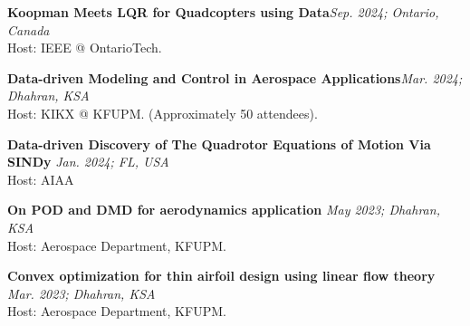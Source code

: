 \textbf{Koopman Meets LQR for Quadcopters using Data}\hfill {\textit{Sep. 2024; Ontario, Canada}}\\
Host: IEEE @ OntarioTech.
\vspace{0.1cm}

\textbf{Data-driven Modeling and Control in Aerospace Applications}\hfill {\textit{Mar. 2024; Dhahran, KSA}}\\
Host: KIKX @ KFUPM. (Approximately 50 attendees).
\vspace{0.1cm}

\textbf{Data-driven Discovery of The Quadrotor Equations of Motion Via SINDy} \hfill {\textit{Jan. 2024; FL, USA}}\\
Host: AIAA
\vspace{0.1cm}

\textbf{On POD and DMD for aerodynamics application} \hfill {\textit{May 2023; Dhahran, KSA}}\\
Host: Aerospace Department, KFUPM.
\vspace{0.1cm}

\textbf{Convex optimization for thin airfoil design using linear flow theory} \hfill {\textit{Mar. 2023; Dhahran, KSA}}\\
Host: Aerospace Department, KFUPM.